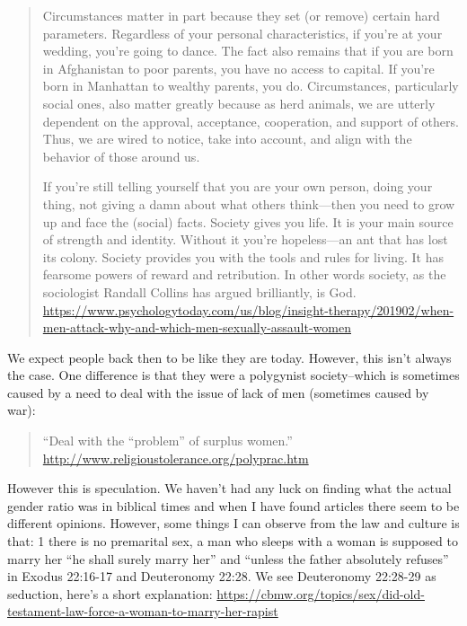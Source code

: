 \documentclass[11pt]{article}
\begin{document}
\begin{quote}
Circumstances matter in part because they set (or remove) certain hard parameters. Regardless of your personal characteristics, if you’re at your wedding, you’re going to dance. The fact also remains that if you are born in Afghanistan to poor parents, you have no access to capital. If you’re born in Manhattan to wealthy parents, you do. Circumstances, particularly social ones, also matter greatly because as herd animals, we are utterly dependent on the approval, acceptance, cooperation, and support of others. Thus, we are wired to notice, take into account, and align with the behavior of those around us.

If you’re still telling yourself that you are your own person, doing your thing, not giving a damn about what others think—then you need to grow up and face the (social) facts. Society gives you life. It is your main source of strength and identity. Without it you’re hopeless—an ant that has lost its colony. Society provides you with the tools and rules for living. It has fearsome powers of reward and retribution. In other words society, as the sociologist Randall Collins has argued brilliantly, is God.
\url{https://www.psychologytoday.com/us/blog/insight-therapy/201902/when-men-attack-why-and-which-men-sexually-assault-women}
\end{quote}

We expect people back then to be like they are today. However, this isn’t always the case. One difference is that they were a polygynist society--which is sometimes caused by a need to deal with the issue of lack of men (sometimes caused by war):
\begin{quote}
“Deal with the “problem” of surplus women.” \newline
\url{http://www.religioustolerance.org/polyprac.htm}
\end{quote}
However this is speculation. We haven’t had any luck on finding what the actual gender ratio was in biblical times and when I have found articles there seem to be different opinions. However, some things I can observe from the law and culture is that: 1 there is no premarital sex, a man who sleeps with a woman is supposed to marry her “he shall surely marry her” and “unless the father absolutely refuses” in Exodus 22:16-17 and Deuteronomy 22:28. We see Deuteronomy 22:28-29 as seduction, here's a short explanation: \url{https://cbmw.org/topics/sex/did-old-testament-law-force-a-woman-to-marry-her-rapist} 
\end{document}
